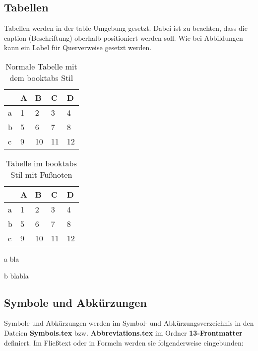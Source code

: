 \subsection{Tabellen}
\label{sec:Beispiele_Tabelle}
%
Tabellen werden in der table-Umgebung gesetzt.
Dabei ist zu beachten, dass die caption (Beschriftung) oberhalb positioniert werden soll.
Wie bei Abbildungen kann ein Label für Querverweise gesetzt werden.
%
\begin{table}[htb]
	\centering
	\caption{Normale Tabelle mit dem booktabs Stil}
	\label{tab:SampleTable}
	\begin{tabular}{@{}lllll@{}}
		\toprule
		& A & B  & C  & D  \\ \midrule
		a & 1 & 2  & 3  & 4  \\
		b & 5 & 6  & 7  & 8  \\
		c & 9 & 10 & 11 & 12 \\ \bottomrule
	\end{tabular}
\end{table}
%
\begin{table}[htb]
 	\centering
    \caption{Tabelle im booktabs Stil mit Fußnoten}
 	\label{tab:anytab}
 	\begin{threeparttable}
 		\begin{tabular}{@{}lllll@{}}
		\toprule
		& A & B  & C  & D  \\ \midrule
		a & 1 & 2  & 3  & 4  \\
		b & 5\tnote{a} & 6  & 7  & 8  \\
		c & 9 & 10 & 11 & 12\tnote{b} \\ \bottomrule
	    \end{tabular}
 		\begin{tablenotes}
 			\item[a]	\footnotesize	bla
 			\item[b]	\footnotesize	blabla
 		\end{tablenotes}
 	\end{threeparttable}
 \end{table}
%
%
%
\subsection{Symbole und Abkürzungen}
\label{sec:Beispiele_SymboleAbk}
%
Symbole und Abkürzungen werden im Symbol- und Abkürzungsverzeichnis in den Dateien \textbf{Symbols.tex} bzw. \textbf{Abbreviations.tex} im Ordner \textbf{13-Frontmatter} definiert.
Im Fließtext oder in Formeln werden sie folgenderweise eingebunden:
%
%
%
